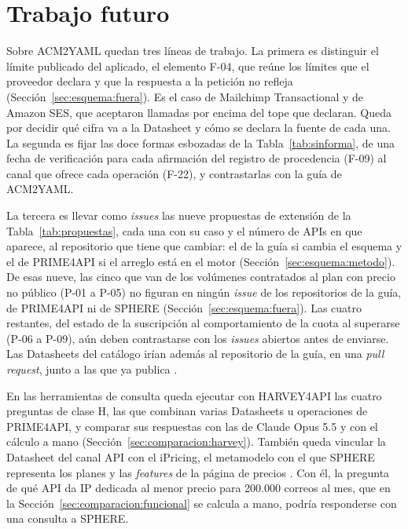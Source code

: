 \section{Trabajo futuro}\label{sec:conclusiones:futuro}

Sobre ACM2YAML quedan tres líneas de trabajo.
La primera es distinguir el límite publicado del aplicado, el elemento F-04, que reúne los límites que el proveedor declara y que la respuesta a la petición no refleja (Sección~\ref{sec:esquema:fuera}).
Es el caso de Mailchimp Transactional y de Amazon SES, que aceptaron llamadas por encima del tope que declaran.
Queda por decidir qué cifra va a la Datasheet y cómo se declara la fuente de cada una.
La segunda es fijar las doce formas esbozadas de la Tabla~\ref{tab:sinforma}, de una fecha de verificación para cada afirmación del registro de procedencia (F-09) al canal que ofrece cada operación (F-22), y contrastarlas con la guía de ACM2YAML.

La tercera es llevar como \textit{issues} las nueve propuestas de extensión de la Tabla~\ref{tab:propuestas}, cada una con su caso y el número de APIs en que aparece, al repositorio que tiene que cambiar: el de la guía si cambia el esquema y el de PRIME4API si el arreglo está en el motor (Sección~\ref{sec:esquema:metodo}).
De esas nueve, las cinco que van de los volúmenes contratados al plan con precio no público (P-01 a P-05) no figuran en ningún \textit{issue} de los repositorios de la guía, de PRIME4API ni de SPHERE (Sección~\ref{sec:esquema:fuera}).
Las cuatro restantes, del estado de la suscripción al comportamiento de la cuota al superarse (P-06 a P-09), aún deben contrastarse con los \textit{issues} abiertos antes de enviarse.
Las Datasheets del catálogo irían además al repositorio de la guía, en una \textit{pull request}, junto a las que ya publica \citep{apisconsumptionmodel}.

En las herramientas de consulta queda ejecutar con HARVEY4API las cuatro preguntas de clase H, las que combinan varias Datasheets u operaciones de PRIME4API, y comparar sus respuestas con las de Claude Opus 5.5 y con el cálculo a mano (Sección~\ref{sec:comparacion:harvey}).
También queda vincular la Datasheet del canal API con el iPricing, el metamodelo con el que SPHERE representa los planes y las \textit{features} de la página de precios \citep{garciafernandez2024pricing4saas}.
Con él, la pregunta de qué API da IP dedicada al menor precio para 200.000 correos al mes, que en la Sección~\ref{sec:comparacion:funcional} se calcula a mano, podría responderse con una consulta a SPHERE.


